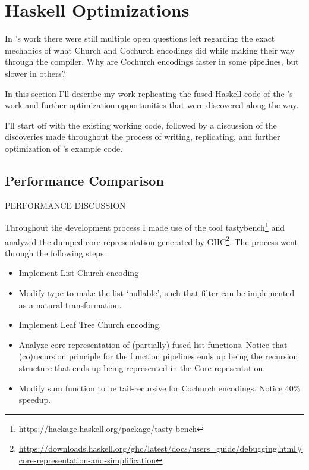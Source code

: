 
\section{Haskell Optimizations}\label{sec:haskell}
In \cite{Harper2011}'s work there were still multiple open questions left regarding the exact mechanics of what Church and Cochurch encodings did while making their way through the compiler. Why are Cochurch encodings faster in some pipelines, but slower in others?

In this section I'll describe my work replicating the fused Haskell code of the \cite{Harper2011}'s work and further optimization opportunities that were discovered along the way.

I'll start off with the existing working code, followed by a discussion of the discoveries made throughout the process of writing, replicating, and further optimization of \cite{Harper2011}'s example code.



\subsection{Performance Comparison}
PERFORMANCE DISCUSSION


Throughout the development process I made use of the tool tastybench\footnote{\url{https://hackage.haskell.org/package/tasty-bench}} and analyzed the dumped core representation generated by GHC\footnote{\url{https://downloads.haskell.org/ghc/latest/docs/users_guide/debugging.html\#core-representation-and-simplification}}.
The process went through the following steps:
\begin{itemize}
    \item Implement List Church encoding
    \item Modify type to make the list `nullable', such that filter can be implemented as a natural transformation.
    \item Implement Leaf Tree Church encoding.
    \item Analyze core representation of (partially) fused list functions. Notice that (co)recursion principle for the function pipelines ends up being the recursion structure that ends up being represented in the Core repesentation.
    \item Modify sum function to be tail-recursive for Cochurch encodings. Notice 40\% speedup.
\end{itemize}






